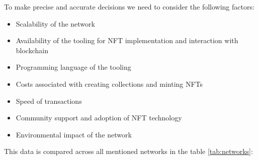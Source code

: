 To make precise and accurate decisions we need to consider the following factors:

\begin{itemize}
    \item Scalability of the network
    \item Availability of the tooling for NFT implementation and interaction with blockchain
    \item Programming language of the tooling
    \item Costs associated with creating collections and minting NFTs
    \item Speed of transactions
    \item Community support and adoption of NFT technology
    \item Environmental impact of the network
\end{itemize}

This data is compared across all mentioned networks in the table \ref{tab:networks}:

